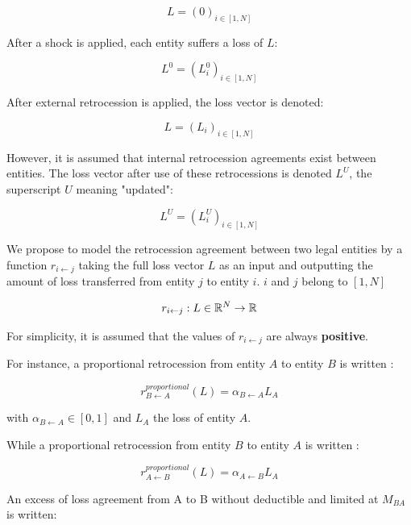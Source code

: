 \begin{equation}
    L = (0)_{i \in [1, N]}
\end{equation}

After a shock is applied, each entity suffers a loss of $L$:

\begin{equation}
    L^0 = (L_i^0)_{i \in [1, N]}
\end{equation}

After external retrocession is applied, the loss vector is denoted:

\begin{equation}
    L = (L_i)_{i \in [1, N]}
\end{equation}


However, it is assumed that internal retrocession agreements exist between entities. The loss vector after use of these retrocessions is denoted $L^U$, the superscript $U$ meaning "updated":

\begin{equation}
    L^U = (L_i^U)_{i \in [1, N]}
\end{equation}


We propose to model the retrocession agreement between two legal entities by a function $r_{i \gets j}$ taking the full loss vector $L$ as an input and outputting the amount of loss transferred from entity $j$ to entity $i$. $i$ and $j$ belong to $[1, N]$

\begin{equation}
    r_{i \gets j} : L \in \mathbb{R}^N \to \mathbb{R}
\end{equation}

For simplicity, it is assumed that the values of $r_{i \gets j}$ are always \textbf{positive}.

For instance, a proportional retrocession from entity $A$ to entity $B$ is written :

\begin{equation}
    r_{B \gets A}^{proportional}(L)  = \alpha_{B \gets A} L_A
\end{equation}

with $\alpha_{ B \gets A} \in [0, 1]$ and $L_A$ the loss of entity $A$.

While a proportional retrocession from entity $B$ to entity $A$ is written :

\begin{equation}
    r_{A \gets B}^{proportional}(L)  = \alpha_{A \gets B} L_A
\end{equation}

An excess of loss agreement from A to B without deductible and limited at $M_{BA}$ is written:

